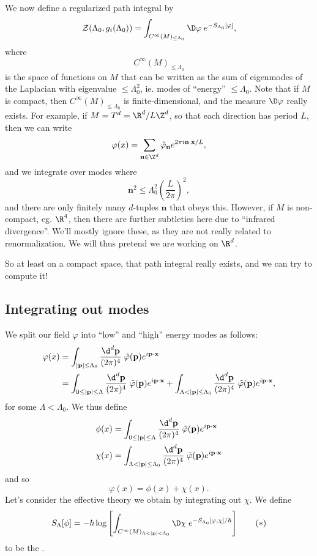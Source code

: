 \documentclass[a4paper]{article}
\begin{document}
We now define a regularized path integral by
\[
  \mathcal{Z}(\Lambda_0, g_i(\Lambda_0)) = \int_{C^\infty(M)_{\leq \Lambda_0}} \D \varphi\;e^{-S_{\Lambda_0}[\varphi]},
\]
where
\[
  C^\infty(M)_{\leq \Lambda_0}
\]
is the space of functions on $M$ that can be written as the sum of eigenmodes of the Laplacian with eigenvalue $\leq \Lambda_0^2$, ie. modes of ``energy'' $\leq \Lambda_0$. Note that if $M$ is compact, then $C^\infty(M)_{\leq \Lambda_0}$ is finite-dimensional, and the measure $\D \varphi$ really exists. For example, if $M = T^d = \R^d/L\Z^d$, so that each direction has period $L$, then we can write
\[
  \varphi(x) = \sum_{\mathbf{n} \in \Z^d} \hat{\varphi}_\mathbf{n} e^{2\pi i \mathbf{n}\cdot \mathbf{x}/L},
\]
and we integrate over modes where
\[
  \mathbf{n}^2 \leq \Lambda_0^2 \left(\frac{L}{2\pi}\right)^2,
\]
and there are only finitely many $d$-tuples $\mathbf{n}$ that obeys this. However, if $M$ is non-compact, eg. $\R^4$, then there are further subtleties here due to ``infrared divergence''. We'll mostly ignore these, as they are not really related to renormalization. We will thus pretend we are working on $\R^d$.

So at least on a compact space, that path integral really exists, and we can try to compute it!

\subsection{Integrating out modes}
We split our field $\varphi$ into ``low'' and ``high'' energy modes as follows:
\begin{align*}
  \varphi(x) &= \int_{|\mathbf{p}| \leq \Lambda_0} \frac{\d^d \mathbf{p}}{ (2\pi)^4}\;\tilde{\varphi}(\mathbf{p}) e^{i\mathbf{p}\cdot \mathbf{x}}\\
  &= \int_{0 \leq |\mathbf{p}| \leq \Lambda} \frac{\d^d \mathbf{p}}{ (2\pi)^4}\;\tilde{\varphi}(\mathbf{p}) e^{i\mathbf{p}\cdot \mathbf{x}} + \int_{\Lambda < |\mathbf{p}| \leq \Lambda_0} \frac{\d^d \mathbf{p}}{ (2\pi)^4}\;\tilde{\varphi}(\mathbf{p}) e^{i\mathbf{p}\cdot \mathbf{x}},
\end{align*}
for some $\Lambda < \Lambda_0$. We thus define
\begin{align*}
  \phi(x) &= \int_{0 \leq |\mathbf{p}| \leq \Lambda} \frac{\d^d \mathbf{p}}{ (2\pi)^4}\;\tilde{\varphi}(\mathbf{p}) e^{i\mathbf{p}\cdot \mathbf{x}} \\
  \chi(x) &= \int_{\Lambda < |\mathbf{p}| \leq \Lambda_0} \frac{\d^d \mathbf{p}}{ (2\pi)^4}\;\tilde{\varphi}(\mathbf{p}) e^{i\mathbf{p}\cdot \mathbf{x}}
\end{align*}
and so
\[
  \varphi(x) = \phi(x) + \chi(x).
\]
Let's consider the effective theory we obtain by integrating out $\chi$. We define
\[
  S_\Lambda[\phi] = -\hbar \log \left[\int_{C^\infty(M)_{\Lambda < |\mathbf{p}| < \Lambda_0}} \D \chi\; e^{-S_{\Lambda_0}[\varphi, \chi]/\hbar}\right] \tag{$*$}
\]
to be the .
\end{document}

